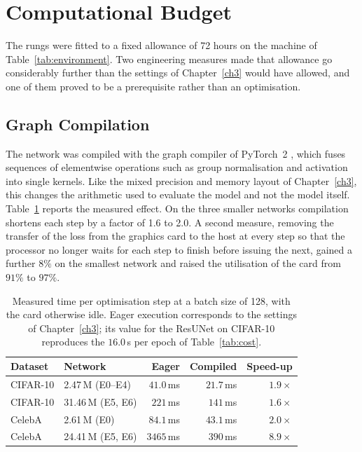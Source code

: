 \section{Computational Budget}
\label{sec:ext-budget}

The rungs were fitted to a fixed allowance of 72 hours on the machine of Table~\ref{tab:environment}.
Two engineering measures made that allowance go considerably further than the settings of
Chapter~\ref{ch3} would have allowed, and one of them proved to be a prerequisite rather than an
optimisation.

\subsection{Graph Compilation}

The network was compiled with the graph compiler of PyTorch~2 \parencite{ansel2024pytorch}, which
fuses sequences of elementwise operations such as group normalisation and activation into single
kernels. Like the mixed precision and memory layout of Chapter~\ref{ch3}, this changes the arithmetic
used to evaluate the model and not the model itself. Table~\ref{tab:ext-steptime} reports the
measured effect. On the three smaller networks compilation shortens each step by a factor of 1.6 to
2.0. A second measure, removing the transfer of the loss from the graphics card to the host at every
step so that the processor no longer waits for each step to finish before issuing the next, gained a
further $8\%$ on the smallest network and raised the utilisation of the card from $91\%$ to $97\%$.

\begin{table}[htbp]
    \centering
    \caption{Measured time per optimisation step at a batch size of 128, with the card otherwise
    idle. Eager execution corresponds to the settings of Chapter~\ref{ch3}; its value for the
    ResUNet on CIFAR-10 reproduces the $16.0$\,s per epoch of Table~\ref{tab:cost}.}
    \label{tab:ext-steptime}
    \begin{tabular}{llrrr}
        \toprule
        Dataset & Network & Eager & Compiled & Speed-up \\
        \midrule
        CIFAR-10 & 2.47\,M (E0--E4)  & $41.0$\,ms  & $21.7$\,ms  & $1.9\times$ \\
        CIFAR-10 & 31.46\,M (E5, E6) & $221$\,ms   & $141$\,ms   & $1.6\times$ \\
        CelebA   & 2.61\,M (E0)      & $84.1$\,ms  & $43.1$\,ms  & $2.0\times$ \\
        CelebA   & 24.41\,M (E5, E6) & $3465$\,ms  & $390$\,ms   & $8.9\times$ \\
        \bottomrule
    \end{tabular}
\end{table}

